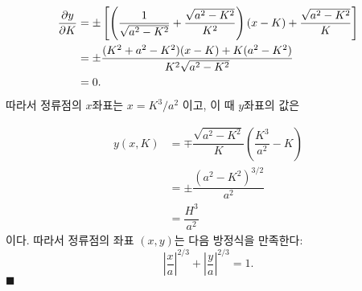 \documentclass[twocolumn]{article}
\begin{document}
$$ \begin{aligned}
{\frac{\partial y}{\partial K}} &= \pm\left[\left( \dfrac{1}{\sqrt{a^2-K^2}}+\dfrac{\sqrt{a^2-K^2}}{K^2}\right) (x-K) + \dfrac{\sqrt{a^2-K^2}}{K} \right]\\
	&= \pm \dfrac{(K^2+a^2-K^2)(x-K)+K(a^2-K^2)}{K^2\sqrt{a^2-K^2}}\\
	&= 0.
\end{aligned}
$$
따라서 정류점의 $x$좌표는 $x = K^3/a^2$ 이고, 이 때 $y$좌표의 값은

$$ \begin{aligned}
y(x, K) &= \mp \dfrac{\sqrt{a^2-K^2}}{K}\left(\dfrac{K^3}{a^2}-K\right)\\
	& = \pm \dfrac{\left( a^2- K^2 \right)^{3/2}}{a^2}\\
	& = \dfrac{H^3}{a^2}
\end{aligned}
$$
이다. 따라서 정류점의 좌표 $(x, y)$는 다음 방정식을 만족한다:
$$ \left|\dfrac{x}{a}\right|^{2/3} + \left|\dfrac{y}{a}\right|^{2/3} = 1. $$
$\blacksquare$
\end{document}
